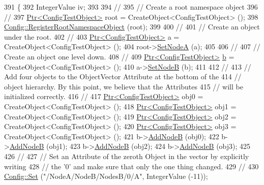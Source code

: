 \begin{DoxyCode}
391 \{
392   IntegerValue iv;
393 
394   \textcolor{comment}{//}
395   \textcolor{comment}{// Create a root namespace object}
396   \textcolor{comment}{//}
397   \hyperlink{classns3_1_1Ptr}{Ptr<ConfigTestObject>} root = CreateObject<ConfigTestObject> ();
398   \hyperlink{group__config_gadf663c596f54bed678e83cccd4e3d9d5}{Config::RegisterRootNamespaceObject} (root);
399 
400   \textcolor{comment}{//}
401   \textcolor{comment}{// Create an object under the root.}
402   \textcolor{comment}{//}
403   \hyperlink{classns3_1_1Ptr}{Ptr<ConfigTestObject>} a = CreateObject<ConfigTestObject> ();
404   root->\hyperlink{classConfigTestObject_aa1f3fc0f4e345021d93d6f3704eae58a}{SetNodeA} (a);
405 
406   \textcolor{comment}{//}
407   \textcolor{comment}{// Create an object one level down.}
408   \textcolor{comment}{//}
409   \hyperlink{classns3_1_1Ptr}{Ptr<ConfigTestObject>} \hyperlink{buildings__pathloss_8m_a21ad0bd836b90d08f4cf640b4c298e7c}{b} = CreateObject<ConfigTestObject> ();
410   a->\hyperlink{classConfigTestObject_a4bbf3c248c741e2f0840c3db3a88ad5c}{SetNodeB} (b);
411 
412   \textcolor{comment}{//}
413   \textcolor{comment}{// Add four objects to the ObjectVector Attribute at the bottom of the }
414   \textcolor{comment}{// object hierarchy.  By this point, we believe that the Attributes}
415   \textcolor{comment}{// will be initialized correctly.}
416   \textcolor{comment}{//}
417   \hyperlink{classns3_1_1Ptr}{Ptr<ConfigTestObject>} obj0 = CreateObject<ConfigTestObject> ();
418   \hyperlink{classns3_1_1Ptr}{Ptr<ConfigTestObject>} obj1 = CreateObject<ConfigTestObject> ();
419   \hyperlink{classns3_1_1Ptr}{Ptr<ConfigTestObject>} obj2 = CreateObject<ConfigTestObject> ();
420   \hyperlink{classns3_1_1Ptr}{Ptr<ConfigTestObject>} obj3 = CreateObject<ConfigTestObject> ();
421   b->\hyperlink{classConfigTestObject_a288533076f98c4ef77ca2181294b0f32}{AddNodeB} (obj0);
422   b->\hyperlink{classConfigTestObject_a288533076f98c4ef77ca2181294b0f32}{AddNodeB} (obj1);
423   b->\hyperlink{classConfigTestObject_a288533076f98c4ef77ca2181294b0f32}{AddNodeB} (obj2);
424   b->\hyperlink{classConfigTestObject_a288533076f98c4ef77ca2181294b0f32}{AddNodeB} (obj3);
425 
426   \textcolor{comment}{//}
427   \textcolor{comment}{// Set an Attribute of the zeroth Object in the vector by explicitly writing}
428   \textcolor{comment}{// the '0' and make sure that only the one thing changed.}
429   \textcolor{comment}{//}
430   \hyperlink{group__config_gadce03667ec621d64ce4aace85d9bcfd0}{Config::Set} (\textcolor{stringliteral}{"/NodeA/NodeB/NodesB/0/A"}, IntegerValue (-11));

\end{DoxyCode}
